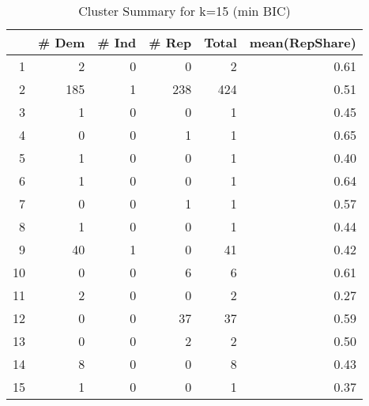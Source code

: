 \begin{table}[ht]
\centering
\begin{tabular}{rrrrrr}
  \hline
 & \# Dem & \# Ind & \# Rep & Total & mean(RepShare) \\ 
  \hline
1 &   2 &   0 &   0 &   2 & 0.61 \\ 
  2 & 185 &   1 & 238 & 424 & 0.51 \\ 
  3 &   1 &   0 &   0 &   1 & 0.45 \\ 
  4 &   0 &   0 &   1 &   1 & 0.65 \\ 
  5 &   1 &   0 &   0 &   1 & 0.40 \\ 
  6 &   1 &   0 &   0 &   1 & 0.64 \\ 
  7 &   0 &   0 &   1 &   1 & 0.57 \\ 
  8 &   1 &   0 &   0 &   1 & 0.44 \\ 
  9 &  40 &   1 &   0 &  41 & 0.42 \\ 
  10 &   0 &   0 &   6 &   6 & 0.61 \\ 
  11 &   2 &   0 &   0 &   2 & 0.27 \\ 
  12 &   0 &   0 &  37 &  37 & 0.59 \\ 
  13 &   0 &   0 &   2 &   2 & 0.50 \\ 
  14 &   8 &   0 &   0 &   8 & 0.43 \\ 
  15 &   1 &   0 &   0 &   1 & 0.37 \\ 
   \hline
\end{tabular}
\caption{Cluster Summary for k=15 (min BIC)} 
\label{tab:k_means_summary}
\end{table}
